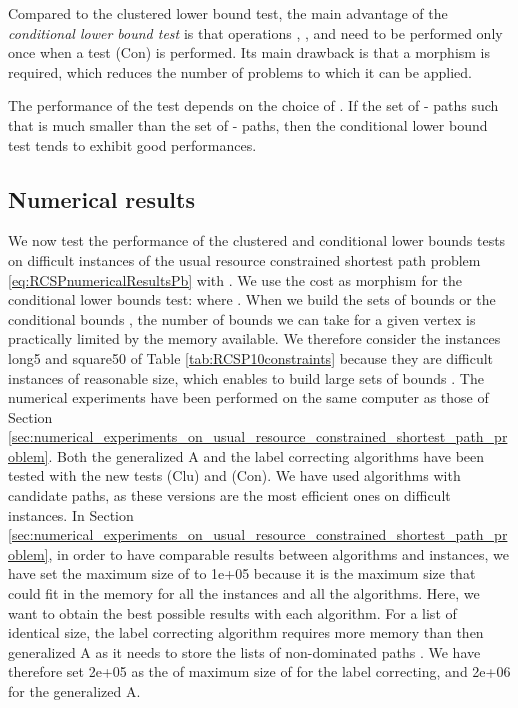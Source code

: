 \documentclass[11pt]{amsart}
\theoremstyle{plain}
\theoremstyle{remark}
\begin{document}
Compared to the clustered lower bound test, the main advantage of the \emph{conditional lower bound test} is that operations , , and  need to be performed only once when a test (Con) is performed. Its main drawback is that a morphism  is required, which reduces the number of problems to which it can be applied.

The performance of the test depends on the choice of . If the set of - paths  such that  is much smaller than the set of - paths, then the conditional lower bound test tends to exhibit good performances.

\subsection{Numerical results} \label{sub:numerical_results}



We now test the performance of the clustered and conditional lower bounds tests on difficult instances of the usual resource constrained shortest path problem \eqref{eq:RCSPnumericalResultsPb} with . We use the cost as morphism  for the conditional lower bounds test:  where . When we build the sets of bounds  or the conditional bounds , the number of bounds we can take for a given vertex  is practically limited by the memory available. We therefore consider the instances long5 and square50 of Table \ref{tab:RCSP10constraints} because they are difficult instances of reasonable size, which enables to build large sets of bounds . The numerical experiments have been performed on the same computer as those of Section \ref{sec:numerical_experiments_on_usual_resource_constrained_shortest_path_problem}. Both the generalized A and the label correcting algorithms have been tested with the new tests (Clu) and (Con). We have used algorithms with candidate paths, as these versions are the most efficient ones on difficult instances.  In Section \ref{sec:numerical_experiments_on_usual_resource_constrained_shortest_path_problem}, in order to have comparable results between algorithms and instances, we have set the maximum size of  to 1e+05 because it is the maximum size that could fit in the memory for all the instances and all the algorithms. Here, we want to obtain the best possible results with each algorithm. For a list  of identical size, the label correcting algorithm requires more memory than then generalized A as it needs to store the lists of non-dominated paths . We have therefore set 2e+05 as the of maximum size of  for the label correcting, and 2e+06 for the generalized A.
\end{document}
